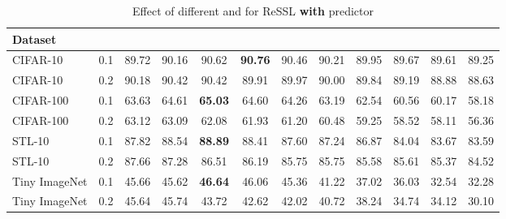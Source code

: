 \documentclass{article}
\newcommand{\<}{\left\langle}
\renewcommand{\>}{\right\rangle}
\begin{document}
\renewcommand\arraystretch{1.0}
\begin{table*}[h]
 \centering
 \setlength\tabcolsep{3pt}
 \caption{Effect of different  and  for ReSSL \textbf{with} predictor}
 \vspace{-10pt}
 \label{table:ablation_t_pred}
\begin{tabular}{l c c c c c c c c c c c} 
\toprule 
Dataset        &  &  &  &  &  &  &  &  &   &   &  \\  \hline
CIFAR-10       & 0.1 & 89.72  & 90.16 & 90.62 & \textbf{90.76}  & 90.46 & 90.21 & 89.95 & 89.67 & 89.61 & 89.25 \\
CIFAR-10       & 0.2 & 90.18  & 90.42 & 90.42 & 89.91 & 89.97 & 90.00 & 89.84 & 89.19 & 88.88 & 88.63 \\ \hline
CIFAR-100      & 0.1 & 63.63  & 64.61 & \textbf{65.03} & 64.60 & 64.26 & 63.19 & 62.54 & 60.56 & 60.17 & 58.18 \\
CIFAR-100      & 0.2 & 63.12  & 63.09 & 62.08 & 61.93 & 61.20 & 60.48 & 59.25 & 58.52 & 58.11 & 56.36 \\ \hline
STL-10         & 0.1 & 87.82  & 88.54 & \textbf{88.89} & 88.41 & 87.60 & 87.24 & 86.87 & 84.04 & 83.67 & 83.59 \\
STL-10         & 0.2 & 87.66  & 87.28 & 86.51 & 86.19 & 85.75 & 85.75 & 85.58 & 85.61 & 85.37 & 84.52 \\ \hline
Tiny ImageNet  & 0.1 & 45.66  & 45.62 & \textbf{46.64} & 46.06 & 45.36 & 41.22 & 37.02 & 36.03 & 32.54 & 32.28 \\
Tiny ImageNet  & 0.2 & 45.64  & 45.74 & 43.72 & 42.62 & 42.02 & 40.72 & 38.24 & 34.74 & 34.12 & 30.10 \\
\bottomrule 
\end{tabular}
\vspace{-10pt}
\end{table*}
\end{document}
